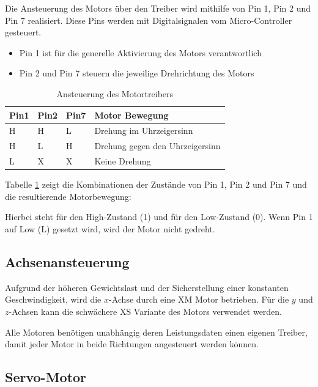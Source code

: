 \documentclass[conference,compsoc,final,a4paper]{IEEEtran}
\begin{document}
\noindent Die Ansteuerung des Motors über den Treiber wird mithilfe von Pin 1, Pin 2 und Pin 7 realisiert. 
Diese Pins werden mit Digitalsignalen vom Micro-Controller gesteuert.
\begin{itemize}
  \item Pin 1 ist für die generelle Aktivierung des Motors verantwortlich
  \item Pin 2 und Pin 7 steuern die jeweilige Drehrichtung des Motors
\end{itemize}

\begin{table}[h]
  \caption{Ansteuerung des Motortreibers \autocite{l293DataSheet}}
  \label{AnsteuerungMotor}
  \centering
  \begin{tabular}{llll}
    \toprule
    \textbf{Pin1} & \textbf{Pin2} & \textbf{Pin7} & \textbf{Motor Bewegung}  \\ 
    \midrule
    H             & H             & L             & Drehung im Uhrzeigersinn        \\
    H             & L             & H             & Drehung gegen den Uhrzeigersinn \\
    L             & X             & X             & Keine Drehung                   \\ 
    \bottomrule
  \end{tabular}
  \end{table}
  
\noindent Tabelle \ref{AnsteuerungMotor} zeigt die Kombinationen der Zustände von Pin 1, Pin 2 und Pin 7 und die resultierende Motorbewegung:

\noindent Hierbei steht \grqq{} für den High-Zustand (1) und \grqq{} für den Low-Zustand (0). Wenn Pin 1 auf Low (L) gesetzt wird, wird der Motor nicht gedreht.

\subsection{Achsenansteuerung}

Aufgrund der höheren Gewichtslast und der Sicherstellung einer konstanten Geschwindigkeit, wird die $x$-Achse durch eine XM Motor betrieben.
Für die $y$ und $z$-Achsen kann die schwächere XS Variante des Motors verwendet werden.

Alle Motoren benötigen unabhängig deren Leistungsdaten einen eigenen Treiber, damit jeder Motor in beide Richtungen angesteuert werden können.

\subsection{Servo-Motor}
\end{document}
